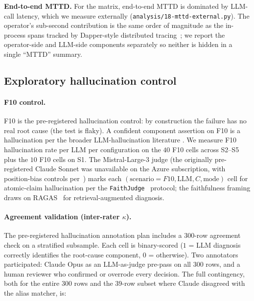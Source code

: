 \documentclass[sigconf, nonacm=true, anonymous=false, review=false]{acmart}
\newcommand{\Cn}[1]{C#1\xspace}
\newcommand{\fn}[1]{F#1\xspace}
\begin{document}
\textbf{End-to-end MTTD.} For the matrix, end-to-end MTTD is
dominated by LLM-call latency, which we measure externally
(\texttt{analysis/18-mttd-external.py}). The operator's
sub-second contribution is the same order of magnitude as the
in-process spans tracked by Dapper-style distributed
tracing~\cite{dapper_2010}; we report the operator-side and
LLM-side components separately so neither is hidden in a single
``MTTD'' summary.

\subsection{Exploratory hallucination control}
\label{sec:hallu-exploratory}

\paragraph{F10 control.} \fn{10} is the pre-registered hallucination
control: by construction the failure has no real root cause (the test
is flaky). A confident component assertion on \fn{10} is a
hallucination per the broader LLM-hallucination literature
\cite{ji2023hallucination, manakul_selfcheckgpt_2023,
li_halueval_2023}. We measure \fn{10} hallucination rate per LLM
per configuration on the $40$ \fn{10} cells across S2--S5 plus the
$10$ \fn{10} cells on S1. The Mistral-Large-3 judge (the originally
pre-registered Claude Sonnet was unavailable on the Azure
subscription, with position-bias controls
per~\cite{shi_position_bias_2024}) marks each
$(\text{scenario} = \fn{10}, \text{LLM}, \Cn{}, \text{mode})$ cell
for atomic-claim hallucination per the
\texttt{FaithJudge}~\cite{tamber_faithjudge_2025} protocol; the
faithfulness framing draws on
RAGAS~\cite{es_ragas_2023} for retrieval-augmented diagnosis.

\paragraph{Agreement validation (inter-rater $\kappa$).}
The pre-registered hallucination annotation plan includes a 300-row
agreement check on a stratified subsample. Each cell is
binary-scored ($1$ = LLM diagnosis correctly identifies the
root-cause component, $0$ = otherwise). Two annotators participated:
Claude Opus as an LLM-as-judge pre-pass on all 300 rows, and a
human reviewer who confirmed or overrode every decision. The full
contingency, both for the entire 300 rows and the 39-row subset
where Claude disagreed with the alias matcher, is:
\end{document}
